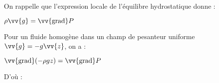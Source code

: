 \documentclass[a4paper]{article}
\begin{document}
\pagestyle{fancy}
\fancyhf{}
\setlength{\headheight}{15pt}

\begin{center}
	\large{}
\end{center}


On rappelle que l'expression locale de l'équilibre hydrostatique donne : \begin{center}\(\rho\vv{g}=\vv{\mathrm{grad}}P\)\end{center}
Pour un fluide homogène dans un champ de pesanteur uniforme \(\vv{g}=-g\vv{z}\), on a : 
\begin{center}\(\vv{\mathrm{grad}}(-\rho gz)=\vv{\mathrm{grad}}P\)\end{center}
D'où : \begin{center}\end{center}
\end{document}
